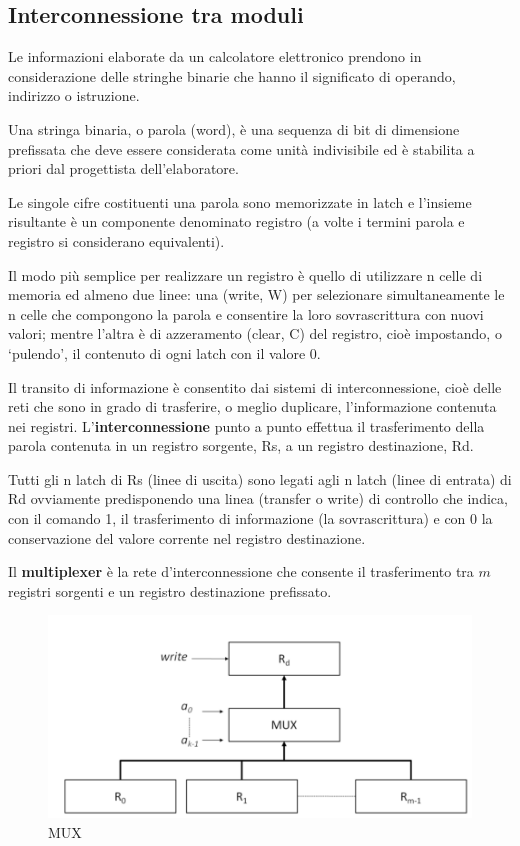 \documentclass[12pt]{article}
\begin{document}
\subsection{Interconnessione tra moduli}
Le informazioni elaborate da un calcolatore elettronico prendono in considerazione delle stringhe binarie che hanno il significato di operando, indirizzo o istruzione.\par\medskip\noindent
Una stringa binaria, o parola (word), è una sequenza di bit di dimensione prefissata che deve essere considerata come unità indivisibile ed è stabilita a priori dal progettista dell’elaboratore. \par\medskip\noindent
Le singole cifre costituenti una parola sono memorizzate in latch e l’insieme risultante è un componente denominato registro (a volte i termini parola e registro si considerano equivalenti).\par\medskip\noindent
Il modo più semplice per realizzare un registro è quello di utilizzare n celle di memoria ed almeno due linee: una (write, W) per selezionare simultaneamente le n celle che compongono la parola e consentire la loro sovrascrittura con nuovi valori; mentre l’altra è di azzeramento (clear, C) del registro, cioè impostando, o ‘pulendo’, il contenuto di ogni latch con il valore 0. \par\medskip\noindent
Il transito di informazione è consentito dai sistemi di interconnessione, cioè delle reti che sono in
grado di trasferire, o meglio duplicare, l’informazione contenuta nei registri.
L’\textbf{interconnessione} punto a punto effettua il trasferimento della parola contenuta in un registro sorgente, Rs, a un registro destinazione, Rd. \par\medskip\noindent
Tutti gli n latch di Rs (linee di uscita) sono legati agli n latch (linee di entrata) di Rd ovviamente predisponendo una linea (transfer o write) di controllo che indica, con il comando 1, il trasferimento di informazione (la sovrascrittura) e con 0 la conservazione del valore corrente nel registro destinazione. \par\medskip\noindent
Il \textbf{multiplexer} è la rete d’interconnessione che consente il trasferimento tra \(m\) registri sorgenti e un registro destinazione prefissato.
\begin{figure}[h]
    \centering
    \includegraphics[width=0.50\linewidth]{mux.png}
    \caption{MUX}
    \label{fig:enter-label}
\end{figure}
\end{document}
